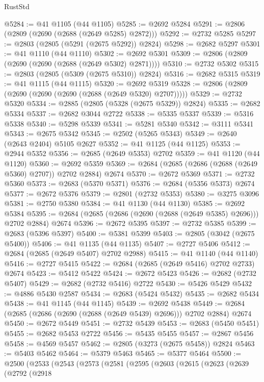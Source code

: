 \begin{lexlean}{RustStd}
\begin{coremodule}
{\begin{coremodule}
{{{{{{{{{{{{{{{{{{{{{{{{{{@5284 := @41 @1105 (@44 @1105)
@5285 := @2692 @5284
@5291 := @2806 (@2809 (@2690 (@2688 (@2649 @5285) @2872)))
@5292 := @2732 @5285
@5297 := @2803 (@2805 (@5291 (@2675 @5292)) @2824)
@5298 := @2682 @5297
@5301 := @41 @1110 (@44 @1110)
@5302 := @2692 @5301
@5309 := @2806 (@2809 (@2690 (@2690 (@2688 (@2649 @5302) @2871))))
@5310 := @2732 @5302
@5315 := @2803 (@2805 (@5309 (@2675 @5310)) @2824)
@5316 := @2682 @5315
@5319 := @41 @1115 (@44 @1115)
@5320 := @2692 @5319
@5328 := @2806 (@2809 (@2690 (@2690 (@2690 (@2688 (@2649 @5320) @2707)))))
@5329 := @2732 @5320
@5334 := @2885 (@2805 (@5328 (@2675 @5329)) @2824)
@5335 := @2682 @5334
@5337 := @2682 @3044 @2722
@5338 := @5335 @5337
@5339 := @5316 @5338
@5340 := @5298 @5339
@5341 := @5281 @5340
@5342 := @3111 @5341
@5343 := @2675 @5342
@5345 := @2502 (@5265 @5343)
@5349 := @2640 (@2643 @2404) @5105 @2627
@5352 := @41 @1125 (@44 @1125)
@5353 := @2944 @5352
@5356 := @2685 (@2649 @5353) @2702
@5359 := @41 @1120 (@44 @1120)
@5360 := @2692 @5359
@5369 := @2684 (@2685 (@2686 (@2688 (@2649 @5360) @2707)) @2702 @2884) @2674
@5370 := @2672 @5369
@5371 := @2732 @5360
@5373 := @2683 (@5370 @5371)
@5376 := @2684 (@5356 @5373) @2674
@5377 := @2672 @5376
@5379 := @2801 (@2732 @5353)
@5380 := @3275 @3096
@5381 := @2750 @5380
@5384 := @41 @1130 (@44 @1130)
@5385 := @2692 @5384
@5395 := @2684 (@2685 (@2686 (@2690 (@2688 (@2649 @5385) @2696))) @2702 @2884) @2674
@5396 := @2672 @5395
@5397 := @2732 @5385
@5399 := @2683 (@5396 @5397)
@5400 := @5381 @5399
@5403 := @2805 (@3042 (@2675 @5400))
@5406 := @41 @1135 (@44 @1135)
@5407 := @2727 @5406
@5412 := @2684 (@2685 (@2649 @5407) @2702 @2988)
@5415 := @41 @1140 (@44 @1140)
@5416 := @2727 @5415
@5422 := @2684 (@2685 (@2649 @5416) @2702 @2733) @2674
@5423 := @5412 @5422
@5424 := @2672 @5423
@5426 := @2682 (@2732 @5407)
@5429 := @2682 (@2732 @5416) @2722
@5430 := @5426 @5429
@5432 := @4886 @5430 @2587
@5434 := @2683 (@5424 @5432)
@5435 := @2682 @5434
@5438 := @41 @1145 (@44 @1145)
@5439 := @2692 @5438
@5449 := @2684 (@2685 (@2686 (@2690 (@2688 (@2649 @5439) @2696))) @2702 @2884) @2674
@5450 := @2672 @5449
@5451 := @2732 @5439
@5453 := @2683 (@5450 @5451)
@5455 := @2682 @5453 @2722
@5456 := @5435 @5455
@5457 := @2867 @5456
@5458 := @4569 @5457
@5462 := @2805 (@3273 (@2675 @5458)) @2824
@5463 := @5403 @5462
@5464 := @5379 @5463
@5465 := @5377 @5464
@5500 := @2500
    (@2533
      (@2543
        (@2573
          (@2581
            (@2595
              (@2603
                (@2615
                  (@2623
                    (@2639
                      (@2792
                        (@2918
}}}}}}}}}}}}}}}}}}}}}}}}}}
\end{coremodule}}
\end{coremodule}
\end{lexlean}
